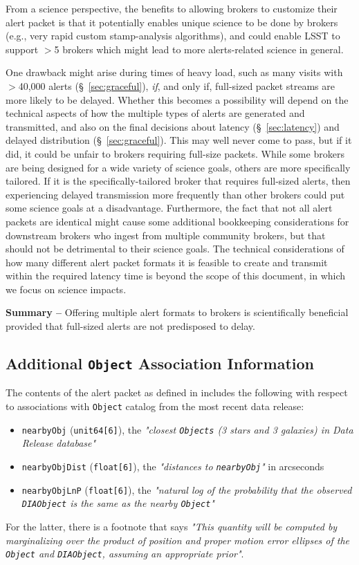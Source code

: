 \documentclass[DM,lsstdraft,authoryear,toc]{lsstdoc}
\begin{document}
From a science perspective, the benefits to allowing brokers to customize their alert packet is that it potentially enables unique science to be done by brokers (e.g., very rapid custom stamp-analysis algorithms), and could enable LSST to support $>$5 brokers which might lead to more alerts-related science in general.

One drawback might arise during times of heavy load, such as many visits with $>$40,000 alerts (\S~\ref{sec:graceful}), \emph{if}, and only if, full-sized packet streams are more likely to be delayed.
Whether this becomes a possibility will depend on the technical aspects of how the multiple types of alerts are generated and transmitted, and also on the final decisions about latency (\S~\ref{sec:latency}) and delayed distribution (\S~\ref{sec:graceful}).
This may well never come to pass, but if it did, it could be unfair to brokers requiring full-size packets.
While some brokers are being designed for a wide variety of science goals, others are more specifically tailored.
If it is the specifically-tailored broker that requires full-sized alerts, then experiencing delayed transmission more frequently than other brokers could put some science goals at a disadvantage. 
Furthermore, the fact that not all alert packets are identical might cause some additional bookkeeping considerations for downstream brokers who ingest from multiple community brokers, but that should not be detrimental to their science goals.
The technical considerations of how many different alert packet formats it is feasible to create and transmit within the required latency time is beyond the scope of this document, in which we focus on science impacts.

{\bf Summary --} Offering multiple alert formats to brokers is scientifically beneficial provided that full-sized alerts are not predisposed to delay.

\subsection{Additional {\tt Object} Association Information}\label{ssec:packets_add}

The contents of the alert packet as defined in  includes the following with respect to associations with {\tt Object} catalog from the most recent data release:
\begin{itemize}
\item {\tt nearbyObj} ({\tt unit64[6]}), the {\it "closest {\tt Objects} (3 stars and 3 galaxies) in Data Release database"}
\item {\tt nearbyObjDist} ({\tt float[6]}), the {\it "distances to {\tt nearbyObj}"} in arcseconds
\item {\tt nearbyObjLnP} ({\tt float[6]}), the {\it "natural log of the probability that the observed {\tt DIAObject} is the same as the nearby {\tt Object}"}
\end{itemize}
For the latter, there is a footnote that says {\it "This quantity will be computed by marginalizing over the product of position and proper motion error ellipses of the {\tt Object} and {\tt DIAObject}, assuming an appropriate prior"}.
\end{document}
